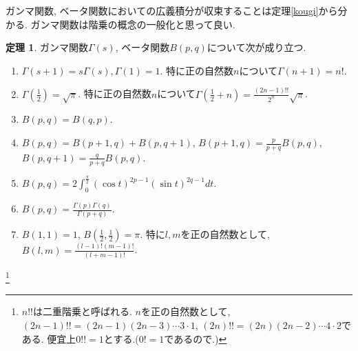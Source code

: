\documentclass[dvipdfmx,a4paper,11pt]{article}
\theoremstyle{definition}
\newtheorem{thm}{定理}
\begin{document}
ガンマ関数, ベータ関数においての広義積分が収束することは定理\ref{kougi}から分かる.
ガンマ関数は階乗の概念の一般化と思って良い.
   \begin{tcolorbox}[
    colback = white,
    colframe = green!35!black,
    fonttitle = \bfseries,
    breakable = true]
    \begin{thm}
    \label{gam}
  ガンマ関数$\Gamma(s)$, ベータ関数$B(p,q)$について次が成り立つ.
  \begin{enumerate}
  \item $\Gamma(s+1)=s\Gamma(s), \Gamma(1)=1$. 特に正の自然数$n$について$\Gamma(n+1)=n!$.
  \item $\Gamma(\frac{1}{2}) = \sqrt{\pi}$.
  特に正の自然数$n$について$\Gamma(\frac{1}{2} +n)=\frac{(2n-1)!!}{2^n} \sqrt{\pi}$.
  \item $B(p,q)=B(q,p)$.
  \item $B(p,q)=B(p+1,q)+B(p,q+1)$, $B(p+1,q)=\frac{p}{p+q}B(p,q)$, $B(p,q+1)=\frac{q}{p+q}B(p,q)$.
  \item $B(p,q)=2\int_{0}^{\frac{\pi}{2}} (\cos t)^{2p-1}(\sin t)^{2q-1} dt$.
  \item $B(p,q)=\frac{\Gamma(p)\Gamma(q)}{\Gamma(p+q)}$.
  \item $B(1,1)=1$, $B(\frac{1}{2},\frac{1}{2})=\pi$.
  特に$l,m$を正の自然数として, $B(l,m)=\frac{(l-1)!(m-1)!}{(l+m-1)!}$.
  \end{enumerate}

    \end{thm}
 \end{tcolorbox}
 \footnote{$n!!$は二重階乗と呼ばれる. $n$を正の自然数として, $(2n-1)!!=(2n-1)(2n-3) \cdots 3\cdot1 $, $(2n)!!=(2n)(2n-2) \cdots 4\cdot2 $である. 便宜上$0!!=1$とする.($0!=1$であるので.)}
 
\end{document}
